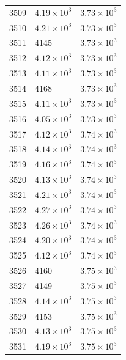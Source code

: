 \begin{table}[H]
\begin{tabular}{lll}
3509 & $\displaystyle 4.19 \times 10^{3}$ & $\displaystyle 3.73 \times 10^{3}$ \\
3510 & $\displaystyle 4.21 \times 10^{3}$ & $\displaystyle 3.73 \times 10^{3}$ \\
3511 & 4145 & $\displaystyle 3.73 \times 10^{3}$ \\
3512 & $\displaystyle 4.12 \times 10^{3}$ & $\displaystyle 3.73 \times 10^{3}$ \\
3513 & $\displaystyle 4.11 \times 10^{3}$ & $\displaystyle 3.73 \times 10^{3}$ \\
3514 & 4168 & $\displaystyle 3.73 \times 10^{3}$ \\
3515 & $\displaystyle 4.11 \times 10^{3}$ & $\displaystyle 3.73 \times 10^{3}$ \\
3516 & $\displaystyle 4.05 \times 10^{3}$ & $\displaystyle 3.73 \times 10^{3}$ \\
3517 & $\displaystyle 4.12 \times 10^{3}$ & $\displaystyle 3.74 \times 10^{3}$ \\
3518 & $\displaystyle 4.14 \times 10^{3}$ & $\displaystyle 3.74 \times 10^{3}$ \\
3519 & $\displaystyle 4.16 \times 10^{3}$ & $\displaystyle 3.74 \times 10^{3}$ \\
3520 & $\displaystyle 4.13 \times 10^{3}$ & $\displaystyle 3.74 \times 10^{3}$ \\
3521 & $\displaystyle 4.21 \times 10^{3}$ & $\displaystyle 3.74 \times 10^{3}$ \\
3522 & $\displaystyle 4.27 \times 10^{3}$ & $\displaystyle 3.74 \times 10^{3}$ \\
3523 & $\displaystyle 4.26 \times 10^{3}$ & $\displaystyle 3.74 \times 10^{3}$ \\
3524 & $\displaystyle 4.20 \times 10^{3}$ & $\displaystyle 3.74 \times 10^{3}$ \\
3525 & $\displaystyle 4.12 \times 10^{3}$ & $\displaystyle 3.74 \times 10^{3}$ \\
3526 & 4160 & $\displaystyle 3.75 \times 10^{3}$ \\
3527 & 4149 & $\displaystyle 3.75 \times 10^{3}$ \\
3528 & $\displaystyle 4.14 \times 10^{3}$ & $\displaystyle 3.75 \times 10^{3}$ \\
3529 & 4153 & $\displaystyle 3.75 \times 10^{3}$ \\
3530 & $\displaystyle 4.13 \times 10^{3}$ & $\displaystyle 3.75 \times 10^{3}$ \\
3531 & $\displaystyle 4.19 \times 10^{3}$ & $\displaystyle 3.75 \times 10^{3}$ \\

\end{tabular}
\end{table}
